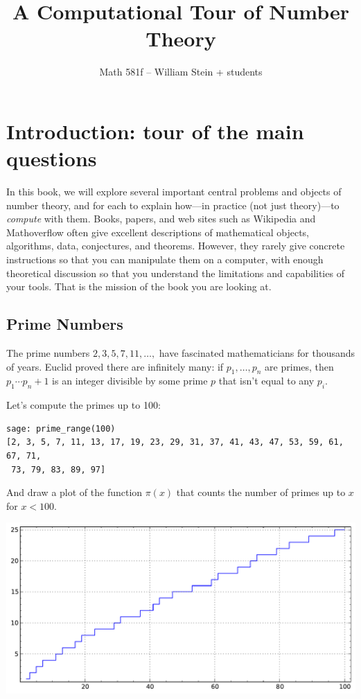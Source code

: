 \documentclass{book}
\title{A Computational Tour of Number Theory}
\author{Math 581f -- William Stein + students}
\begin{document}
\maketitle
\tableofcontents

\chapter{Introduction: tour of the main questions}
In this book, we will explore several important central problems and
objects of number theory, and for each to explain how---in practice
(not just theory)---to {\em compute} with them.    Books,
papers, and web sites such as Wikipedia and Mathoverflow often
give excellent descriptions
of mathematical objects, algorithms, data, conjectures, and theorems.
However, they rarely give concrete instructions
so that you can manipulate them on a computer, with enough theoretical
discussion so that you understand the limitations and capabilities of
your tools.  That is the mission of the book you are looking at.


\section{Prime Numbers}
The prime numbers $2,3,5,7,11,\ldots, $ have fascinated
mathematicians for thousands of years.  Euclid proved there
are infinitely many: if $p_1,\ldots, p_n$ are primes,
then $p_1\cdots p_n + 1$ is an integer divisible by some
prime $p$ that isn't equal to any $p_i$.

Let's compute the primes up to 100:
\begin{lstlisting}
sage: prime_range(100)
[2, 3, 5, 7, 11, 13, 17, 19, 23, 29, 31, 37, 41, 43, 47, 53, 59, 61, 67, 71,
 73, 79, 83, 89, 97]
\end{lstlisting}
And draw a plot of the function $\pi(x)$ that counts the number of primes up to $x$ for $x<100$.
\begin{center}
\includegraphics[width=.7\textwidth]{pics/prime_pi-2-100.pdf}
\end{center}
\end{document}
